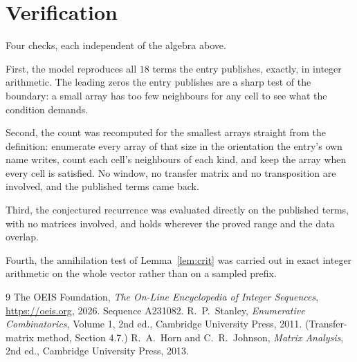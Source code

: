 \documentclass[11pt,a4paper]{article}
\theoremstyle{plain}
\theoremstyle{definition}
\begin{document}
\section{Verification}

Four checks, each independent of the algebra above.

First, the model reproduces all $18$ terms the entry publishes, exactly, in integer
arithmetic. The leading zeros the entry publishes are a sharp test of the boundary: a small
array has too few neighbours for any cell to see what the condition demands.

Second, the count was recomputed for the smallest arrays straight from the definition:
enumerate every array of that size in the orientation the entry's own name writes, count each
cell's neighbours of each kind, and keep the array when every cell is satisfied. No window, no
transfer matrix and no transposition are involved, and the published terms came back.

Third, the conjectured recurrence was evaluated directly on the published terms, with no
matrices involved, and holds wherever the proved range and the data overlap.

Fourth, the annihilation test of Lemma~\ref{lem:crit} was carried out in exact integer
arithmetic on the whole vector rather than on a sampled prefix.

\begin{thebibliography}{9}
 The OEIS Foundation, \emph{The On-Line Encyclopedia of Integer
Sequences}, \url{https://oeis.org}, 2026. Sequence A231082.
 R.~P.~Stanley, \emph{Enumerative Combinatorics}, Volume 1, 2nd ed.,
Cambridge University Press, 2011. (Transfer-matrix method, Section 4.7.)
 R.~A.~Horn and C.~R.~Johnson, \emph{Matrix Analysis}, 2nd ed., Cambridge
University Press, 2013.
\end{thebibliography}
\end{document}
